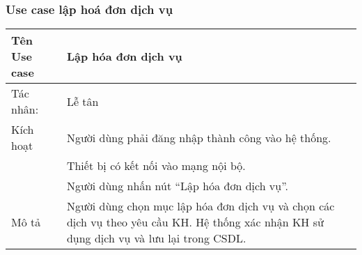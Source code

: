 \documentclass{article}
\begin{document}
\begin{flushleft}
		\subsubsection{Use case lập hoá đơn dịch vụ}
		\begin{table}[h!]
		\centering
			\begin{tabular}{|l|l|}
				\hline
				Tên Use case            & Lập hóa đơn dịch vụ\\ \hline
				Tác nhân:            & Lễ tân \\ \hline
				Kích hoạt     &Người dùng phải đăng nhập thành công vào hệ thống. \\&Thiết bị có kết nối vào mạng nội bộ. \\&Người dùng nhấn nút “Lập hóa đơn dịch vụ”. \\ \hline
		    	Mô tả   &Người dùng chọn mục lập hóa đơn dịch vụ và chọn các dịch vụ  theo yêu cầu KH. Hệ thống xác nhận KH sử dụng dịch vụ và lưu lại trong CSDL. \\ \hline
			

\end{tabular}
\end{table}
\end{flushleft}
\end{document}
